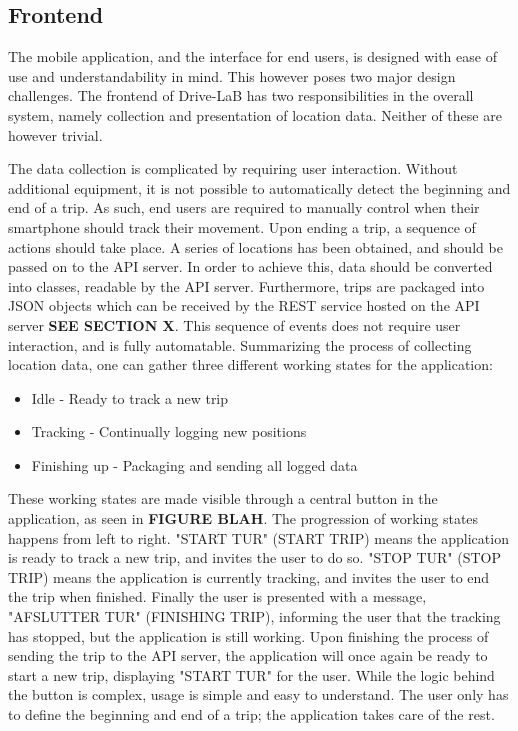 \subsection{Frontend}\label{subsec:frontend_design}
The mobile application, and the interface for end users, is designed with ease of use and understandability in mind. This however poses two major design challenges. The frontend of Drive-LaB has two responsibilities in the overall system, namely collection and presentation of location data. Neither of these are however trivial.

The data collection is complicated by requiring user interaction. Without additional equipment, it is not possible to automatically detect the beginning and end of a trip. As such, end users are required to manually control when their smartphone should track their movement. Upon ending a trip, a sequence of actions should take place. A series of locations has been obtained, and should be passed on to the API server. In order to achieve this, data should be converted into classes, readable by the API server. Furthermore, trips are packaged into JSON objects which can be received by the REST service hosted on the API server \textbf{SEE SECTION X}. This sequence of events does not require user interaction, and is fully automatable. Summarizing the process of collecting location data, one can gather three different working states for the application:

\begin{itemize}
\item Idle - Ready to track a new trip
\item Tracking - Continually logging new positions
\item Finishing up - Packaging and sending all logged data
\end{itemize}

These working states are made visible through a central button in the application, as seen in \textbf{FIGURE BLAH}. The progression of working states happens from left to right. "START TUR" (START TRIP) means the application is ready to track a new trip, and invites the user to do so. "STOP TUR" (STOP TRIP) means the application is currently tracking, and invites the user to end the trip when finished. Finally the user is presented with a message, "AFSLUTTER TUR" (FINISHING TRIP), informing the user that the tracking has stopped, but the application is still working. Upon finishing the process of sending the trip to the API server, the application will once again be ready to start a new trip, displaying "START TUR" for the user.
While the logic behind the button is complex, usage is simple and easy to understand. The user only has to define the beginning and end of a trip; the application takes care of the rest.

